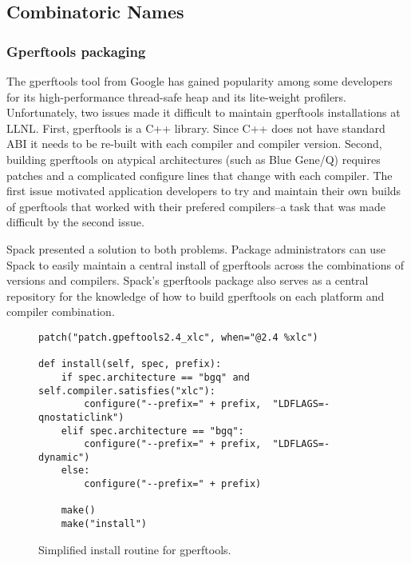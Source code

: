 
\subsection{Combinatoric Names}
\label{sec:usecase-combinatoric}


\subsubsection{Gperftools packaging}

The gperftools tool from Google has gained popularity among some developers for
its high-performance thread-safe heap and its lite-weight profilers.
Unfortunately, two issues made it difficult to maintain gperftools installations
at LLNL.  First, gperftools is a C++ library.  Since C++ does not have standard
ABI it needs to be re-built with each compiler and compiler version.  Second,
building gperftools on atypical architectures (such as Blue Gene/Q) requires
patches and a complicated configure lines that change with each compiler.  The
first issue motivated application developers to try and maintain their own builds
of gperftools that worked with their prefered compilers--a task that was made
difficult by the second issue.

Spack presented a solution to both problems.  Package administrators can use Spack to
easily maintain a central install of gperftools across the combinations of versions
and compilers.  Spack's gperftools package also serves as a central repository for
the knowledge of how to build gperftools on each platform and compiler combination.

\begin{figure}
\begin{verbatim}
patch("patch.gpeftools2.4_xlc", when="@2.4 %xlc")

def install(self, spec, prefix):
    if spec.architecture == "bgq" and self.compiler.satisfies("xlc"):
        configure("--prefix=" + prefix,  "LDFLAGS=-qnostaticlink")
    elif spec.architecture == "bgq":
        configure("--prefix=" + prefix,  "LDFLAGS=-dynamic")
    else:
        configure("--prefix=" + prefix)

    make()
    make("install")
\end{verbatim}
  \caption{
    Simplified install routine for gperftools.
    \label{fig:gperftools}
  }
\end{figure}

